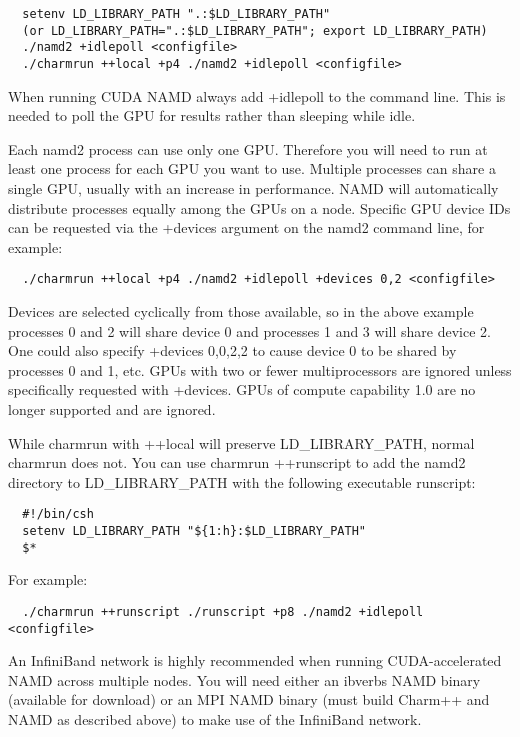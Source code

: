\begin{verbatim}
  setenv LD_LIBRARY_PATH ".:$LD_LIBRARY_PATH"
  (or LD_LIBRARY_PATH=".:$LD_LIBRARY_PATH"; export LD_LIBRARY_PATH)
  ./namd2 +idlepoll <configfile>
  ./charmrun ++local +p4 ./namd2 +idlepoll <configfile>
\end{verbatim}

When running CUDA NAMD always add +idlepoll to the command line.  This
is needed to poll the GPU for results rather than sleeping while idle.

Each namd2 process can use only one GPU.  Therefore you will need to run
at least one process for each GPU you want to use.  Multiple processes
can share a single GPU, usually with an increase in performance.  NAMD
will automatically distribute processes equally among the GPUs on a node.
Specific GPU device IDs can be requested via the +devices argument on
the namd2 command line, for example:

\begin{verbatim}
  ./charmrun ++local +p4 ./namd2 +idlepoll +devices 0,2 <configfile>
\end{verbatim}

Devices are selected cyclically from those available, so in the above
example processes 0 and 2 will share device 0 and processes 1 and 3 will
share device 2.  One could also specify +devices 0,0,2,2 to cause device
0 to be shared by processes 0 and 1, etc.  GPUs with two or fewer
multiprocessors are ignored unless specifically requested with +devices.
GPUs of compute capability 1.0 are no longer supported and are ignored.

While charmrun with ++local will preserve LD\_LIBRARY\_PATH, normal
charmrun does not.  You can use charmrun ++runscript to add the namd2
directory to LD\_LIBRARY\_PATH with the following executable runscript:

\begin{verbatim}
  #!/bin/csh
  setenv LD_LIBRARY_PATH "${1:h}:$LD_LIBRARY_PATH"
  $*
\end{verbatim}

For example:

\begin{verbatim}
  ./charmrun ++runscript ./runscript +p8 ./namd2 +idlepoll <configfile>
\end{verbatim}

An InfiniBand network is highly recommended when running CUDA-accelerated
NAMD across multiple nodes.  You will need either an ibverbs NAMD binary
(available for download) or an MPI NAMD binary (must build Charm++ and
NAMD as described above) to make use of the InfiniBand network.

